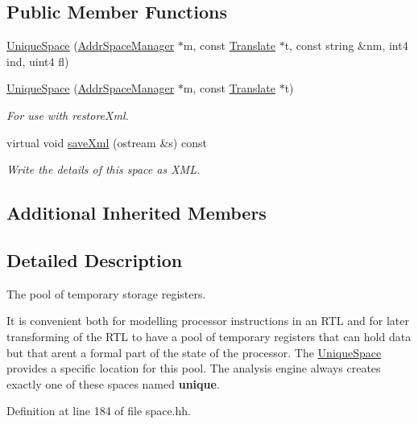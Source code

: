 \subsection*{Public Member Functions}
\begin{DoxyCompactItemize}
\item 
\mbox{\hyperlink{class_unique_space_a89865e280e05b6123fbb4fc351b63b03}{Unique\+Space}} (\mbox{\hyperlink{class_addr_space_manager}{Addr\+Space\+Manager}} $\ast$m, const \mbox{\hyperlink{class_translate}{Translate}} $\ast$t, const string \&nm, int4 ind, uint4 fl)
\item 
\mbox{\hyperlink{class_unique_space_a2e6be3e2ab55c7d98fce723b9ee3047c}{Unique\+Space}} (\mbox{\hyperlink{class_addr_space_manager}{Addr\+Space\+Manager}} $\ast$m, const \mbox{\hyperlink{class_translate}{Translate}} $\ast$t)
\begin{DoxyCompactList}\small\item\em For use with restore\+Xml. \end{DoxyCompactList}\item 
virtual void \mbox{\hyperlink{class_unique_space_a119a41fbbdc811d44d532451ae2785f4}{save\+Xml}} (ostream \&s) const
\begin{DoxyCompactList}\small\item\em Write the details of this space as X\+ML. \end{DoxyCompactList}\end{DoxyCompactItemize}
\subsection*{Additional Inherited Members}


\subsection{Detailed Description}
The pool of temporary storage registers. 

It is convenient both for modelling processor instructions in an R\+TL and for later transforming of the R\+TL to have a pool of temporary registers that can hold data but that aren\textquotesingle{}t a formal part of the state of the processor. The \mbox{\hyperlink{class_unique_space}{Unique\+Space}} provides a specific location for this pool. The analysis engine always creates exactly one of these spaces named {\bfseries{unique}}. 

Definition at line 184 of file space.\+hh.



